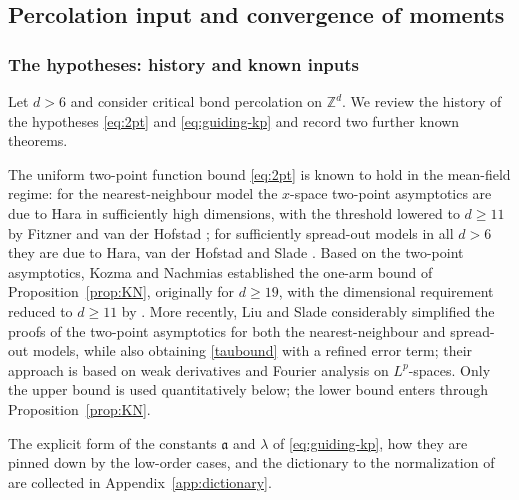 \documentclass[11pt]{article}
\theoremstyle{definition}
\theoremstyle{remark}
\newcommand{\Z}{\mathbb{Z}}
\numberwithin{equation}{section}
\theoremstyle{plain}
\theoremstyle{definition}
\theoremstyle{remark}
\theoremstyle{plain}
\begin{document}
\subsection{Percolation input and convergence of moments}
\label{sec:percolation}

\subsubsection{The hypotheses: history and known inputs}\label{sec:assumptions}

Let $d>6$ and consider critical bond percolation on $\Z^d$. We review the
history of the hypotheses \eqref{eq:2pt} and \eqref{eq:guiding-kp} and record
two further known theorems.



The uniform two-point function bound \eqref{eq:2pt} is known to hold in the mean-field regime:
for the nearest-neighbour model the $x$-space two-point asymptotics are due to
Hara \cite{Har08} in sufficiently high dimensions, with the threshold lowered
to $d\ge11$ by Fitzner and van der Hofstad \cite{FH17}; for sufficiently
spread-out models in all $d>6$ they are due to Hara, van der Hofstad and Slade \cite{HHS03}. Based on the two-point asymptotics, Kozma
and Nachmias \cite{KN11} established the one-arm bound of
Proposition~\ref{prop:KN}, originally for $d\ge19$, with the dimensional
requirement reduced to $d\ge11$ by \cite{FH17}. More recently, Liu and Slade
\cite{LS26,LS26spread} considerably simplified the proofs of the two-point
asymptotics for both the nearest-neighbour and spread-out models, while also
obtaining \eqref{taubound} with a refined error term; their approach is based
on weak derivatives and Fourier analysis on $L^p$-spaces. Only the upper bound is used quantitatively
below; the lower bound enters through Proposition~\ref{prop:KN}.



The explicit form of the constants $\mathfrak a$ and $\lambda$ of \eqref{eq:guiding-kp}, how they are pinned down by the low-order cases, and the dictionary to the normalization of \cite{CCHS26} are collected in Appendix~\ref{app:dictionary}.
\end{document}
